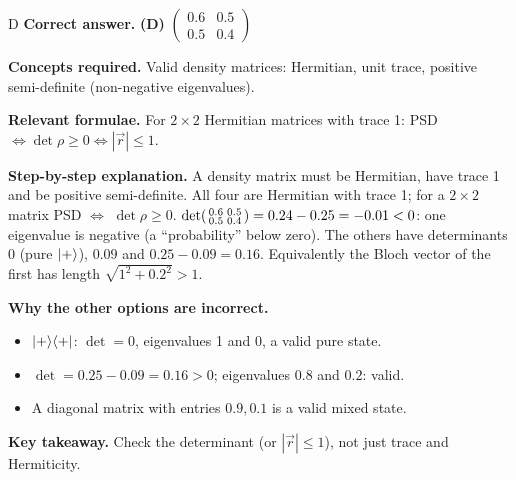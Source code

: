 \documentclass[11pt,a4paper]{article}
\newcommand{\qsep}{\par\vspace{2pt}{\color{black!15}\hrule}\vspace{4pt}}
\begin{document}
\begin{solbox}{D}
\textbf{\color{brand}Correct answer.} \textcolor{okgreen}{\textbf{(D)}} $\begin{pmatrix}0.6 & 0.5\\ 0.5 & 0.4\end{pmatrix}$

\textbf{\color{brand}Concepts required.} Valid density matrices: Hermitian, unit trace, positive semi-definite (non-negative eigenvalues).

\textbf{\color{brand}Relevant formulae.} For $2\times2$ Hermitian matrices with trace 1: PSD $\Leftrightarrow \det\rho \ge 0 \Leftrightarrow |\vec r| \le 1$.

\textbf{\color{brand}Step-by-step explanation.} A density matrix must be Hermitian, have trace 1 and be positive semi-definite. All four are Hermitian with trace 1; for a
$2\times2$ matrix PSD $\Leftrightarrow$ $\det\rho \ge 0$. $\det\begin{psmallmatrix}0.6&0.5\\0.5&0.4\end{psmallmatrix} = 0.24 - 0.25 = -0.01 < 0$:
one eigenvalue is negative (a ``probability'' below zero). The others have determinants $0$ (pure $\ket+$), $0.09$ and $0.25 - 0.09 = 0.16$.
Equivalently the Bloch vector of the first has length $\sqrt{1^2 + 0.2^2} > 1$.

\textbf{\color{brand}Why the other options are incorrect.}
\begin{itemize}[leftmargin=2.4em, itemsep=1pt, topsep=2pt]
\item[\textbf{(A)}] $\ket+\!\bra+$: $\det = 0$, eigenvalues 1 and 0, a valid pure state.
\item[\textbf{(B)}] $\det = 0.25 - 0.09 = 0.16 > 0$; eigenvalues $0.8$ and $0.2$: valid.
\item[\textbf{(C)}] A diagonal matrix with entries $0.9, 0.1$ is a valid mixed state.
\end{itemize}
\textbf{\color{brand}Key takeaway.} Check the determinant (or $|\vec r| \le 1$), not just trace and Hermiticity.
\end{solbox}
\qsep
\end{document}
